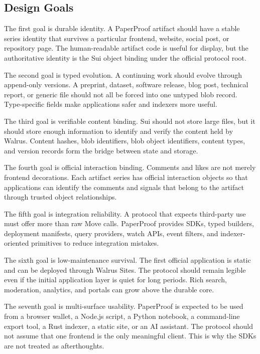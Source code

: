 \documentclass[journal]{IEEEtran}
\begin{document}
\subsection{Design Goals}

The first goal is durable identity. A PaperProof artifact should have a stable series identity that survives a particular frontend, website, social post, or repository page. The human-readable artifact code is useful for display, but the authoritative identity is the Sui object binding under the official protocol root.

The second goal is typed evolution. A continuing work should evolve through append-only versions. A preprint, dataset, software release, blog post, technical report, or generic file should not all be forced into one untyped blob record. Type-specific fields make applications safer and indexers more useful.

The third goal is verifiable content binding. Sui should not store large files, but it should store enough information to identify and verify the content held by Walrus. Content hashes, blob identifiers, blob object identifiers, content types, and version records form the bridge between state and storage.

The fourth goal is official interaction binding. Comments and likes are not merely frontend decorations. Each artifact series has official interaction objects so that applications can identify the comments and signals that belong to the artifact through trusted object relationships.

The fifth goal is integration reliability. A protocol that expects third-party use must offer more than raw Move calls. PaperProof provides SDKs, typed builders, deployment manifests, query providers, watch APIs, event filters, and indexer-oriented primitives to reduce integration mistakes.

The sixth goal is low-maintenance survival. The first official application is static and can be deployed through Walrus Sites. The protocol should remain legible even if the initial application layer is quiet for long periods. Rich search, moderation, analytics, and portals can grow above the durable core.

The seventh goal is multi-surface usability. PaperProof is expected to be used from a browser wallet, a Node.js script, a Python notebook, a command-line export tool, a Rust indexer, a static site, or an AI assistant. The protocol should not assume that one frontend is the only meaningful client. This is why the SDKs are not treated as afterthoughts.
\end{document}

